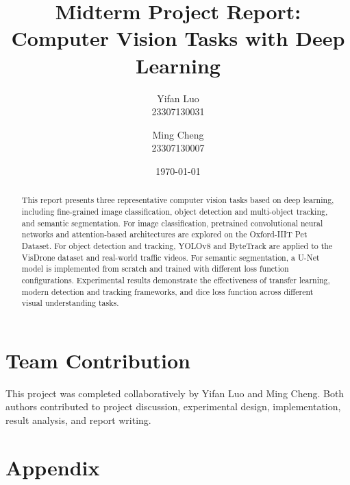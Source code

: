 \documentclass[11pt,a4paper]{article}
\title{Midterm Project Report: Computer Vision Tasks with Deep Learning}
\author{
    Yifan Luo \\
    23307130031
    \and
    Ming Cheng \\
    23307130007
}
\date{\today}
\begin{document}
\maketitle

\section*{Team Contribution}

This project was completed collaboratively by Yifan Luo and Ming Cheng. Both authors contributed to project discussion, experimental design, implementation, result analysis, and report writing.

\begin{abstract}
This report presents three representative computer vision tasks based on deep learning, including fine-grained image classification, object detection and multi-object tracking, and semantic segmentation. For image classification, pretrained convolutional neural networks and attention-based architectures are explored on the Oxford-IIIT Pet Dataset. For object detection and tracking, YOLOv8 and ByteTrack are applied to the VisDrone dataset and real-world traffic videos. For semantic segmentation, a U-Net model is implemented from scratch and trained with different loss function configurations. Experimental results demonstrate the effectiveness of transfer learning, modern detection and tracking frameworks, and dice loss function across different visual understanding tasks.
\end{abstract}

\tableofcontents
\newpage







\newpage

\section*{Appendix}
\end{document}
